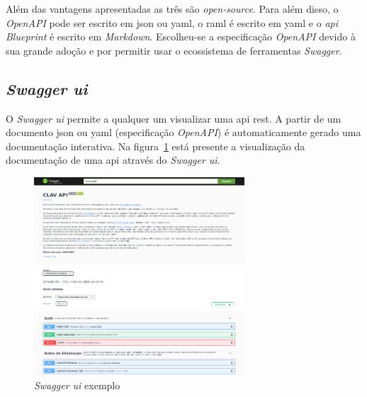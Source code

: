 Além das vantagens apresentadas as três são \textit{open-source}. Para além disso, o \textit{OpenAPI} pode ser escrito em \acrshort{json} ou \acrshort{yaml}, o \acrshort{raml} é escrito em \acrshort{yaml} e o \textit{\acrshort{api} Blueprint} é escrito em \textit{Markdown}. Escolheu-se a especificação \textit{OpenAPI} devido à sua grande adoção e por permitir usar o ecossistema de ferramentas \textit{Swagger}.

\subsection{\textit{Swagger \acrshort{ui}}}

O \textit{Swagger \acrshort{ui}} permite a qualquer um visualizar uma \acrshort{api} \acrshort{rest}. A partir de um documento \acrshort{json} ou \acrshort{yaml} (especificação \textit{OpenAPI}) é automaticamente gerado uma documentação interativa. Na figura~\ref{fig:swaggerUI} está presente a visualização da documentação de uma \acrshort{api} através do \textit{Swagger \acrshort{ui}}.

\begin{figure}[H]
    \centering
    \includegraphics[width=0.7\textwidth]{img/swaggerUI.png}
    \caption{\textit{Swagger \acrshort{ui}} exemplo\label{fig:swaggerUI}}
\end{figure}

